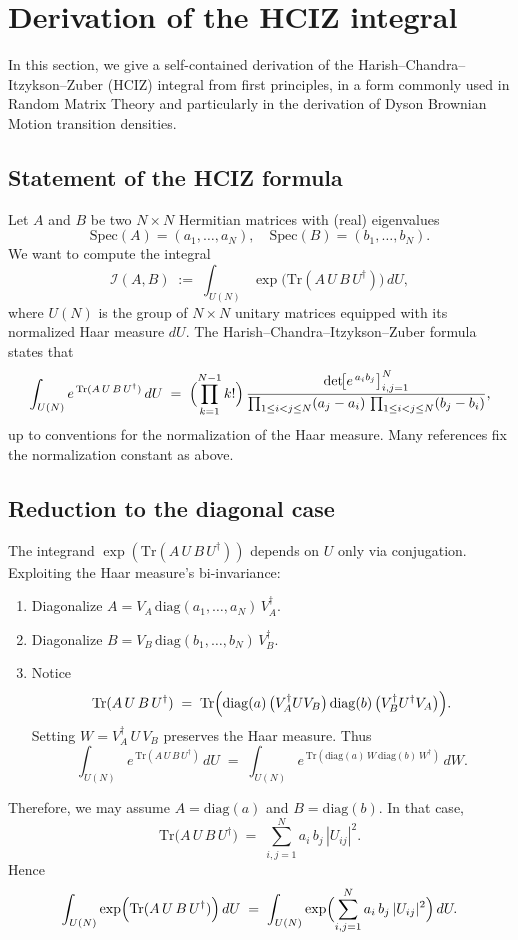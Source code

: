 \documentclass[letterpaper,11pt,oneside,reqno]{article}
\numberwithin{equation}{section}
\theoremstyle{definition}
\begin{document}
\section{Derivation of the HCIZ integral}

In this section, we give a self-contained derivation of the Harish--Chandra--Itzykson--Zuber (HCIZ) integral from first principles, in a form commonly used in Random Matrix Theory and particularly in the derivation of Dyson Brownian Motion transition densities.

\subsection{Statement of the HCIZ formula}

Let \(A\) and \(B\) be two \(N\times N\) Hermitian matrices with (real) eigenvalues
\[
   \mathrm{Spec}(A) = (a_1,\dots,a_N),
   \quad
   \mathrm{Spec}(B) = (b_1,\dots,b_N).
\]
We want to compute the integral
\[
   \mathcal{I}(A,B)
   \;:=\;
   \int_{U(N)}
   \exp\bigl(\mathrm{Tr}(A\,U\,B\,U^\dagger)\bigr)
   \,dU,
\]
where \(U(N)\) is the group of \(N\times N\) unitary matrices equipped with its normalized Haar measure \(dU\).
The Harish--Chandra--Itzykson--Zuber formula states that
\[
   \int_{U(N)}
   e^{\,\mathrm{Tr}(A\,U\,B\,U^\dagger)}
   \,dU
   \;=\;
   \Bigl(\prod_{k=1}^{N-1} k!\Bigr)\,
   \frac{\det\!\bigl[e^{\,a_i b_j}\bigr]_{i,j=1}^N}{\prod_{1\le i<j\le N}(a_j-a_i)\,\prod_{1\le i<j\le N}(b_j-b_i)},
\]
up to conventions for the normalization of the Haar measure. Many references fix
the normalization constant
as above.

\subsection{Reduction to the diagonal case}

The integrand \(\exp(\mathrm{Tr}(A\,U\,B\,U^\dagger))\) depends on \(U\) only via conjugation.  Exploiting the Haar measure's bi-invariance:

\begin{enumerate}
   \item Diagonalize \(A = V_A\,\mathrm{diag}(a_1,\dots,a_N)\,V_A^\dagger\).
   \item Diagonalize \(B = V_B\,\mathrm{diag}(b_1,\dots,b_N)\,V_B^\dagger\).
   \item Notice
   \[
      \mathrm{Tr}(A\,U\,B\,U^\dagger)
      \;=\;
      \mathrm{Tr}\Bigl(\mathrm{diag}(a)\,\bigl(V_A^\dagger U V_B\bigr)\,\mathrm{diag}(b)\,\bigl(V_B^\dagger U^\dagger V_A\bigr)\Bigr).
   \]
   Setting \(W=V_A^\dagger\,U\,V_B\) preserves the Haar measure.  Thus
   \[
      \int_{U(N)} e^{\,\mathrm{Tr}(A\,U\,B\,U^\dagger)}\,dU
      \;=\;
      \int_{U(N)}
      e^{\,\mathrm{Tr}(\mathrm{diag}(a)\,W\,\mathrm{diag}(b)\,W^\dagger)}\,dW.
   \]
\end{enumerate}
Therefore, we may assume \(A=\mathrm{diag}(a)\) and \(B=\mathrm{diag}(b)\).  In that case,
\[
   \mathrm{Tr}\bigl(A\,U\,B\,U^\dagger\bigr)
   \;=\;
   \sum_{i,j=1}^N a_i\,b_j\,|U_{ij}|^2.
\]
Hence
\[
   \int_{U(N)}
   \exp\Bigl(\mathrm{Tr}(A\,U\,B\,U^\dagger)\Bigr)\,dU
   \;=\;
   \int_{U(N)}
   \exp\Bigl(\sum_{i,j=1}^N a_i\,b_j\,|U_{ij}|^2\Bigr)\,dU.
\]
\end{document}
